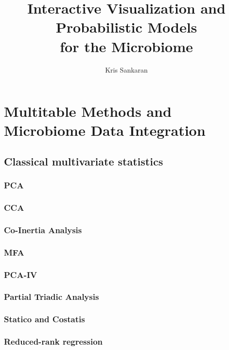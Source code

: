 \documentclass{report}
\title{Interactive Visualization and Probabilistic Models \\
  for the Microbiome}
\author{Kris Sankaran}
\begin{document}
\maketitle
\tableofcontents

\chapter{Multitable Methods and Microbiome Data Integration}

\section{Classical multivariate statistics}

\subsection{PCA}

\subsection{CCA}
\label{sec:cca}

\subsection{Co-Inertia Analysis}

\subsection{MFA}
\label{sec:mfa}

\subsection{PCA-IV}

\subsection{Partial Triadic Analysis}

\subsection{Statico and Costatis}

\subsection{Reduced-rank regression}
\label{sec:rr-reg}
\end{document}
